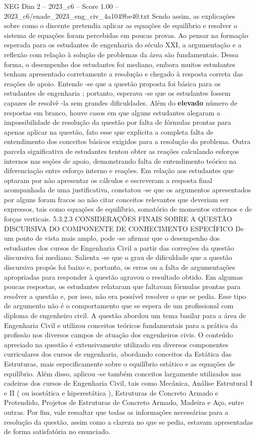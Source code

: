 \begin{textsample}{NEG Dim 2 – 2023\_c6 – Score 1.00 – 2023\_c6/enade\_2023\_eng\_civ\_4a1049be40.txt}
Sendo assim, as explicações sobre como o discente pretendia aplicar as equações de equilíbrio e resolver o sistema de equações foram percebidas em poucas provas.
Ao pensar na formação esperada para os estudantes de engenharia do século XXI, a argumentação e a reflexão com relação à solução de problemas da área são fundamentais.
Dessa forma, o desempenho dos estudantes foi mediano, embora muitos estudantes tenham apresentado corretamente a resolução e chegado à resposta correta das reações de apoio.
Entende -se que a questão proposta foi básica para os estudantes de engenharia ; portanto, esperava -se que os estudantes fossem capazes de resolvê -la sem grandes dificuldades.
Além do \textbf{elevado} número de respostas em branco, houve casos em que alguns estudantes alegaram a impossibilidade de resolução da questão por falta de fórmulas prontas para apenas aplicar na questão, fato esse que explicita a completa falta de entendimento dos conceitos básicos exigidos para a resolução do problema.
Outra parcela significativa de estudantes tentou obter as reações calculando esforços internos nas seções de apoio, demonstrando falta de entendimento teórico na diferenciação entre esforço interno e reações.
Em relação aos estudantes que optaram por não apresentar os cálculos e escreveram a resposta final acompanhada de uma justificativa, constatou -se que os argumentos apresentados por alguns foram fracos ao não citar conceitos relevantes que deveriam ser expressos, tais como equações de equilíbrio, somatório de momentos externos e de forças verticais. 5.3.2.3 CONSIDERAÇÕES FINAIS SOBRE A QUESTÃO DISCURSIVA DO COMPONENTE DE CONHECIMENTO ESPECÍFICO De um ponto de vista mais amplo, pode -se afirmar que o desempenho dos estudantes dos cursos de Engenharia Civil a partir das correções da questão discursiva foi mediano.
Salienta -se que o grau de dificuldade que a questão discursiva propôs foi baixo e, portanto, os erros ou a falta de argumentações apropriadas para responder à questão agravou o resultado obtido.
Em algumas poucas respostas, os estudantes relataram que faltavam fórmulas prontas para resolver a questão e, por isso, não era possível resolver o que se pedia.
Esse tipo de argumento não é o comportamento que se espera de um profissional com diploma de engenheiro civil.
A questão abordou um tema basilar para a área de Engenharia Civil e utilizou conceitos teóricos fundamentais para a prática da profissão nos diversos campos de atuação dos engenheiros civis.
O conteúdo apreciado na questão é extensivamente utilizado em diversos componentes curriculares dos cursos de engenharia, abordando conceitos da Estática das Estruturas, mais especificamente sobre o equilíbrio estático e as equações de equilíbrio.
Além disso, aplicou -se também conceitos largamente utilizados nas cadeiras dos cursos de Engenharia Civil, tais como Mecânica, Análise Estrutural I e II ( ou isostática e hiperestática ), Estruturas de Concreto Armado e Protendido, Projetos de Estruturas de Concreto Armado, Madeira e Aço, entre outras.
Por fim, vale ressaltar que todas as informações necessárias para a resolução da questão, assim como a clareza no que se pedia, estavam apresentadas de forma satisfatória no enunciado.


\end{textsample}

